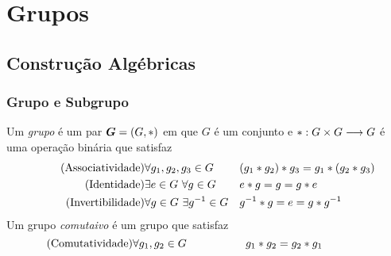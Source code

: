 \chapter{Grupos}

\section{Construção Algébricas}

\subsection{Grupo e Subgrupo}


\begin{defi}
Um \emph{grupo} é um par $\bm G=(G, \ast )$ em que $G$ é um conjunto e $ \ast : G \times G \longrightarrow G$ é uma operação binária que satisfaz
	\begin{align*}
 	\tag{Associatividade} &\forall g_1,g_2,g_3 \in G && (g_1  \ast  g_2)  \ast  g_3 = g_1  \ast  (g_2  \ast  g_3) \label{G1}\\
	\tag{Identidade} &\exists e \in G\ \forall g \in G && e  \ast  g = g =g  \ast  e \label{G2}\\
	\tag{Invertibilidade} &\forall g \in G\ \exists g^{-1} \in G && g^{-1}  \ast  g = e = g  \ast  g^{-1} \label{G3}
	\end{align*}
\noindent
Um grupo \emph{comutaivo} é um grupo que satisfaz
	\begin{equation*}
	\tag{Comutatividade} \forall g_1,g_2 \in G \qquad\qquad\quad\ g_1  \ast  g_2 = g_2  \ast  g_1 \qquad\qquad\qquad\label{G4}
\end{equation*}
\end{defi}

